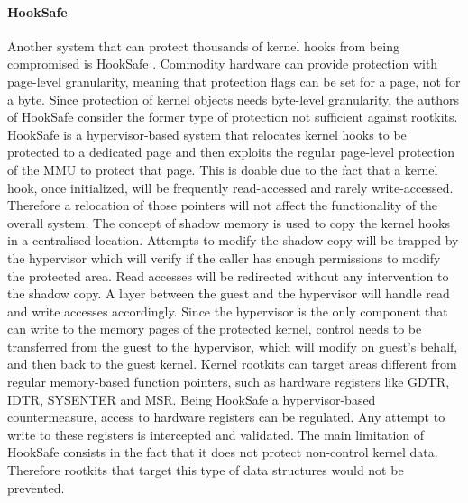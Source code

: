 \paragraph{HookSafe}
Another system that can protect thousands of kernel hooks from being compromised is HookSafe \cite{HookSafe}. Commodity hardware can provide protection with page-level granularity, meaning that protection flags can be set for a page, not for a byte. Since protection of kernel objects needs byte-level granularity, the authors of HookSafe consider the former type of protection not sufficient against rootkits.
HookSafe is a hypervisor-based system that relocates kernel hooks to be protected to a dedicated page and then exploits the regular page-level protection of the MMU to protect that page.
This is doable due to the fact that a kernel hook, once initialized, will be frequently read-accessed and rarely write-accessed. Therefore a relocation of those pointers will not affect the functionality of the overall system.
The concept of shadow memory is used to copy the kernel hooks in a centralised location. Attempts to modify the shadow copy will be trapped by the hypervisor which will verify if the caller has enough permissions to modify the  protected area. Read accesses will be redirected without any intervention to the shadow copy.
A layer between the guest and the hypervisor will handle read and write accesses accordingly. Since the hypervisor is the only component that can write to the memory pages of the protected kernel, control needs to be transferred from the guest to the hypervisor, which will modify on guest's behalf, and then back to the guest kernel.
Kernel rootkits can target areas different from regular memory-based function pointers, such as hardware registers like GDTR, IDTR, SYSENTER and MSR. Being HookSafe a hypervisor-based countermeasure, access to hardware registers can be regulated. Any attempt to write to these registers is intercepted and validated. 
The main limitation of HookSafe consists in the fact that it does not protect non-control kernel data. Therefore rootkits that target this type of data structures would not be prevented.



